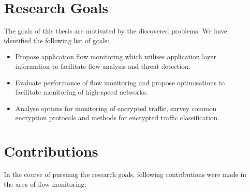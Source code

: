 \section{Research Goals}

The goals of this thesis are motivated by the discovered problems. We have identified the following list of goals:

\begin{itemize}
  \item Propose application flow monitoring which utilises application layer information to facilitate flow analysis and threat detection.
  \item Evaluate performance of flow monitoring and propose optimisations to facilitate monitoring of high-speed networks.
  \item Analyse options for monitoring of encrypted traffic, survey common encryption protocols and methods for encrypted traffic classification.
\end{itemize}


\section{Contributions}

In the course of pursuing the research goals, following contributions were made in the area of flow monitoring:

